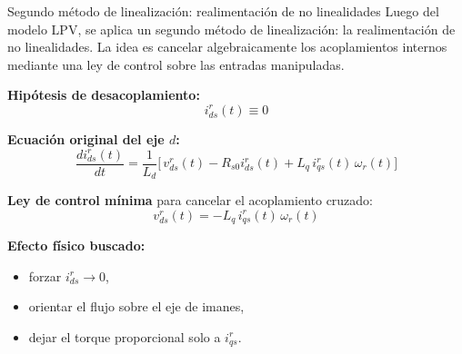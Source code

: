 \documentclass[aspectratio=169,t]{beamer}
\begin{document}
\begin{frame}{Segundo método de linealización: realimentación de no linealidades}
{\small\color{uncGray}Luego del modelo LPV, se aplica un segundo método de linealización: la realimentación de no linealidades. La idea es cancelar algebraicamente los acoplamientos internos mediante una ley de control sobre las entradas manipuladas.}\par
\vspace{3mm}

\textbf{Hipótesis de desacoplamiento:}
\begin{equation*}
i_{ds}^{r}(t)\equiv 0
\end{equation*}

\textbf{Ecuación original del eje $d$:}
\begin{equation*}
\frac{di_{ds}^{r}(t)}{dt}=\frac{1}{L_d}\Big[\,v_{ds}^{r}(t)-R_{s0}i_{ds}^{r}(t)+L_q\,i_{qs}^{r}(t)\,\omega_r(t)\Big]
\end{equation*}

\textbf{Ley de control mínima} para cancelar el acoplamiento cruzado:
\begin{equation*}
\boxed{\;v_{ds}^{r}(t)=-L_q\,i_{qs}^{r}(t)\,\omega_r(t)\;}
\end{equation*}

\textbf{Efecto físico buscado:}
\begin{itemize}
  \item forzar $i_{ds}^{r}\to 0$,
  \item orientar el flujo sobre el eje de imanes,
  \item dejar el torque proporcional solo a $i_{qs}^{r}$.
\end{itemize}
\end{frame}
\end{document}
